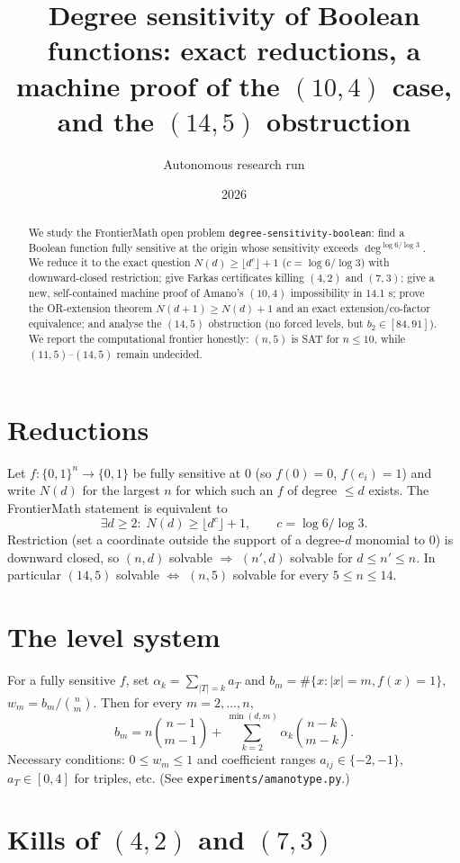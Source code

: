 \documentclass[11pt,a4paper]{article}
\title{Degree sensitivity of Boolean functions: exact reductions, a machine proof
of the $(10,4)$ case, and the $(14,5)$ obstruction}
\author{Autonomous research run}
\date{2026}
\theoremstyle{definition}
\theoremstyle{remark}
\begin{document}
\maketitle

\begin{abstract}
We study the FrontierMath open problem \texttt{degree-sensitivity-boolean}: find a
Boolean function fully sensitive at the origin whose sensitivity exceeds
$\deg^{\log 6/\log 3}$.  We reduce it to the exact question $N(d)\ge
\lfloor d^c\rfloor+1$ ($c=\log 6/\log 3$) with downward-closed restriction; give
Farkas certificates killing $(4,2)$ and $(7,3)$; give a new, self-contained
machine proof of Amano's $(10,4)$ impossibility in 14.1 s; prove the
OR-extension theorem $N(d+1)\ge N(d)+1$ and an exact extension/co-factor
equivalence; and analyse the $(14,5)$ obstruction (no forced levels, but
$b_2\in[84,91]$).  We report the computational frontier honestly:
$(n,5)$ is SAT for $n\le 10$, while $(11,5)$--$(14,5)$ remain undecided.
\end{abstract}

\section{Reductions}
\label{sec:red}

Let $f:\{0,1\}^n\to\{0,1\}$ be fully sensitive at $0$ (so $f(0)=0$,
$f(e_i)=1$) and write $N(d)$ for the largest $n$ for which such an $f$ of
degree $\le d$ exists.  The FrontierMath statement is equivalent to
\[
\exists d\ge 2:\; N(d)\ge \lfloor d^c\rfloor+1,\qquad c=\log 6/\log 3.
\]
Restriction (set a coordinate outside the support of a degree-$d$ monomial to
$0$) is downward closed, so $(n,d)$ solvable $\Rightarrow$ $(n',d)$ solvable
for $d\le n'\le n$.  In particular $(14,5)$ solvable $\iff$ $(n,5)$ solvable
for every $5\le n\le 14$.

\section{The level system}
\label{sec:level}

For a fully sensitive $f$, set $\alpha_k=\sum_{|T|=k}a_T$ and
$b_m=\#\{x:|x|=m,f(x)=1\}$, $w_m=b_m/\binom nm$.  Then for every
$m=2,\dots,n$,
\[
b_m = n\binom{n-1}{m-1}+\sum_{k=2}^{\min(d,m)}\alpha_k\binom{n-k}{m-k}.
\tag{1}
\]
Necessary conditions: $0\le w_m\le 1$ and coefficient ranges
$a_{ij}\in\{-2,-1\}$, $a_T\in[0,4]$ for triples, etc.  (See
\texttt{experiments/amanotype.py}.)

\section{Kills of $(4,2)$ and $(7,3)$}
\label{sec:small}
\end{document}
